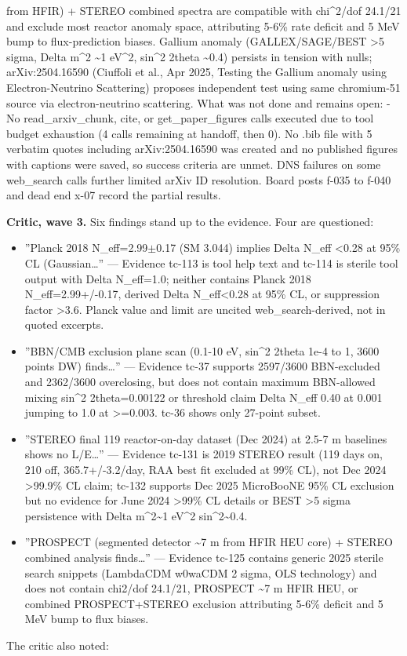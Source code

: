 \documentclass[11pt,a4paper]{article}
\begin{document}
from HFIR) + STEREO combined spectra are compatible with chi\textasciicircum{}2/dof 24.1/21 and exclude most reactor anomaly space, attributing 5-6\% rate deficit and 5 MeV bump to flux-prediction biases. Gallium anomaly (GALLEX/SAGE/BEST \textgreater{}5 sigma, Delta m\textasciicircum{}2 \textasciitilde{}1 eV\textasciicircum{}2, sin\textasciicircum{}2 2theta \textasciitilde{}0.4) persists in tension with nulls; arXiv:2504.16590 (Ciuffoli et al., Apr 2025, Testing the Gallium anomaly using Electron-Neutrino Scattering) proposes independent test using same chromium-51 source via electron-neutrino scattering. What was not done and remains open: - No read\_arxiv\_chunk, cite, or get\_paper\_figures calls executed due to tool budget exhaustion (4 calls remaining at handoff, then 0). No .bib file with 5 verbatim quotes including arXiv:2504.16590 was created and no published figures with captions were saved, so success criteria are unmet. DNS failures on some web\_search calls further limited arXiv ID resolution. Board posts f-035 to f-040 and dead end x-07 record the partial results.

\textbf{Critic, wave 3.} Six findings stand up to the evidence. Four are questioned:

\begin{itemize}
  \item ''Planck 2018 N\_eff=2.99$\pm$0.17 (SM 3.044) implies Delta N\_eff \textless{}0.28 at 95\% CL (Gaussian\ldots{}'' --- Evidence tc-113 is tool help text and tc-114 is sterile tool output with Delta N\_eff=1.0; neither contains Planck 2018 N\_eff=2.99+/-0.17, derived Delta N\_eff\textless{}0.28 at 95\% CL, or suppression factor \textgreater{}3.6. Planck value and limit are uncited web\_search-derived, not in quoted excerpts.
  \item ''BBN/CMB exclusion plane scan (0.1-10 eV, sin\textasciicircum{}2 2theta 1e-4 to 1, 3600 points DW) finds\ldots{}'' --- Evidence tc-37 supports 2597/3600 BBN-excluded and 2362/3600 overclosing, but does not contain maximum BBN-allowed mixing sin\textasciicircum{}2 2theta=0.00122 or threshold claim Delta N\_eff 0.40 at 0.001 jumping to 1.0 at \textgreater{}=0.003. tc-36 shows only 27-point subset.
  \item ''STEREO final 119 reactor-on-day dataset (Dec 2024) at 2.5-7 m baselines shows no L/E\ldots{}'' --- Evidence tc-131 is 2019 STEREO result (119 days on, 210 off, 365.7+/-3.2/day, RAA best fit excluded at 99\% CL), not Dec 2024 \textgreater{}99.9\% CL claim; tc-132 supports Dec 2025 MicroBooNE 95\% CL exclusion but no evidence for June 2024 \textgreater{}99\% CL details or BEST \textgreater{}5 sigma persistence with Delta m\textasciicircum{}2\textasciitilde{}1 eV\textasciicircum{}2 sin\textasciicircum{}2\textasciitilde{}0.4.
  \item ''PROSPECT (segmented detector \textasciitilde{}7 m from HFIR HEU core) + STEREO combined analysis finds\ldots{}'' --- Evidence tc-125 contains generic 2025 sterile search snippets (LambdaCDM w0waCDM 2 sigma, OLS technology) and does not contain chi2/dof 24.1/21, PROSPECT \textasciitilde{}7 m HFIR HEU, or combined PROSPECT+STEREO exclusion attributing 5-6\% deficit and 5 MeV bump to flux biases.
\end{itemize}
The critic also noted:
\end{document}
